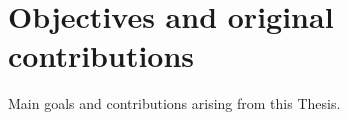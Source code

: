 \chapter{Objectives and original contributions}
\label{sect::goals}

Main goals and contributions arising from this Thesis.